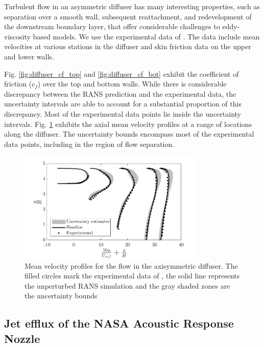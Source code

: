 Turbulent flow in an asymmetric diffuser has many interesting properties, such as separation over a smooth wall, subsequent reattachment, and redevelopment of the downstream boundary layer, that offer considerable challenges to eddy-viscosity based models. We use the experimental data of \cite{buice}. The data include mean velocities at various stations in the diffuser and skin friction data on the upper and lower walls. 

Fig. \ref{fig:diffuser_cf_top} and \ref{fig:diffuser_cf_bot} exhibit the coefficient of friction ($c_f$) over the top and bottom walls. While there is considerable discrepancy between the RANS prediction and the experimental data, the uncertainty intervals are able to account for a substantial proportion of this discrepancy. Most of the experimental data points lie inside the uncertainty intervals. Fig. \ref{fig:diffuser_vel_prof} exhibits the axial mean velocity profiles at a range of locations along the diffuser. The uncertainty bounds encompass most of the experimental data points, including in the region of flow separation. 

\begin{figure}
\centering
\includegraphics[width=0.8\textwidth]{code/image_gen/diffuser/images/diffuser_vel_prof.png}
\caption{Mean velocity profiles for the flow in the axisymmetric diffuser. The filled circles mark the experimental data of \cite{buice}, the solid line represents the unperturbed RANS simulation and the gray shaded zones are the uncertainty bounds\label{fig:diffuser_vel_prof}}
\end{figure}

\subsection{Jet efflux of the NASA Acoustic Response Nozzle}



